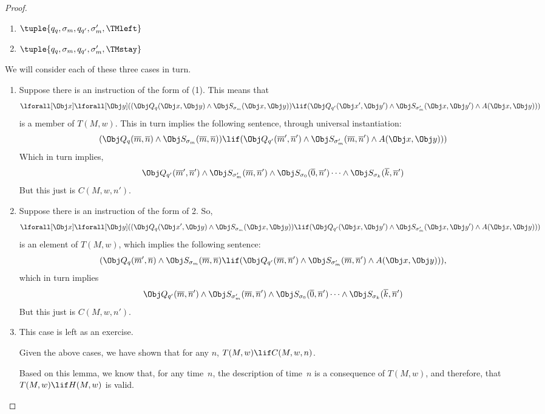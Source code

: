 \documentclass[../../../include/open-logic-section]{subfiles}
\begin{document}
\begin{proof}
\begin{enumerate}
\item $\tuple{q_q, \sigma_m , q_{q'}, \sigma'_{m}, \TMleft}$

\item $\tuple{q_q, \sigma_m , q_{q'}, \sigma'_{m}, \TMstay}$
\end{enumerate}

We will consider each of these three cases in turn.

\begin{enumerate} 
\item Suppose there is an instruction of the form of (1).
This means that 
\[ 
\lforall[\Obj x] \lforall[\Obj y]( (\Obj Q_{q}(\Obj x,
\Obj y) \land \Obj S_{\sigma_m}(\Obj x, \Obj y)) \lif (\Obj Q_{q'}(\Obj x',
\Obj y') \land \Obj S_{\sigma'_{m}}(\Obj x, \Obj y') \land A(\Obj x, \Obj
y))) 
\] 
is a member of $T(M,w)$. This in turn implies the following
sentence, through universal instantiation: 
\[ 
(\Obj Q_{q}(\overline m,
\overline n) \land \Obj S_{\sigma_m}(\overline m, \overline n)) \lif (\Obj
Q_{q'}(\overline m', \overline n') \land \Obj S_{\sigma'_{m}}(\overline m,
\overline n') \land A(\Obj x, \Obj y))) \] Which in turn implies, \[ \Obj
Q_{q'}(\overline m', \overline n') \land \Obj S_{\sigma'_m}(\overline m,
\overline n') \land \Obj S_{\sigma_0}(\overline 0, \overline n')\dots \land
\Obj S_{\sigma_k}(\overline k, \overline n') 
\] 
But this just is $C(M, w, n')$.

\item Suppose there is an instruction of the form of 2. So, 
\[
\lforall[\Obj x] \lforall[\Obj y]( (\Obj Q_{q}(\Obj x', \Obj y) \land \Obj
S_{\sigma_m}(\Obj x, \Obj y)) \lif (\Obj Q_{q'}(\Obj x, \Obj y') \land \Obj
S_{\sigma'_m}(\Obj x, \Obj y') \land A(\Obj x, \Obj y))) 
\] 
is an element of $T(M,w)$, which implies the following sentence: 
\[ 
(\Obj Q_{q}(\overline
m', \overline n) \land \Obj S_{\sigma_m}(\overline m, \overline n) \lif
(\Obj Q_{q'}(\overline m, \overline n') \land \Obj S_{\sigma'_m}(\overline
m, \overline n') \land A(\Obj x, \Obj y))),
\]
which in turn implies \[ \Obj
Q_{q'}(\overline m, \overline n')\land \Obj S_{\sigma'_m}(\overline m,
\overline n') \land \Obj S_{\sigma_0}(\overline 0, \overline n')\dots \land
\Obj S_{\sigma_k}(\overline k, \overline n') 
\] 
But this just is $C(M, w, n')$.

\item This case is left as an exercise.

Given the above cases, we have shown that for any $n$, $T(M, w) \lif C(M,
w, n)$.

Based on this lemma, we know that, for any time~$n$, the description of
time~$n$ is a consequence of $T(M, w)$, and therefore, that $T(M, w) \lif
H(M, w)$ is valid.
\end{enumerate} 
\end{proof}
\end{document}
